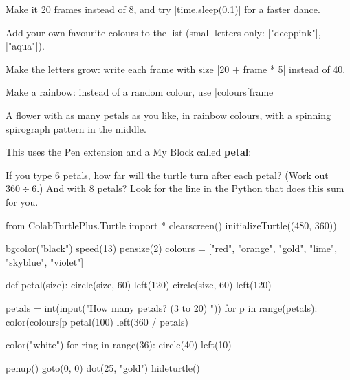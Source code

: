 \begin{challenge}[Level up]
\tick Make it 20 frames instead of 8, and try \py|time.sleep(0.1)| for a faster dance.\par
\tick Add your own favourite colours to the list (small letters only: \py|"deeppink"|, \py|"aqua"|).\par
\tick Make the letters grow: write each frame with size \py|20 + frame * 5| instead of 40.\par
\tick Make a rainbow: instead of a random colour, use \py|colours[frame %
\end{challenge}


A flower with as many petals as you like, in rainbow colours, with a spinning spirograph pattern in the middle.

This uses the Pen extension and a My Block called \textbf{petal}:

\begin{center}
\begin{scratch}
\end{scratch}
\end{center}

\begin{think}
If you type 6 petals, how far will the turtle turn after each petal? (Work out $360 \div 6$.) And with 8 petals? Look for the line in the Python that does this sum for you.
\end{think}

\begin{typethis}
from ColabTurtlePlus.Turtle import *
clearscreen()
initializeTurtle((480, 360))

bgcolor("black")
speed(13)
pensize(2)
colours = ["red", "orange", "gold", "lime",
           "skyblue", "violet"]

def petal(size):
    circle(size, 60)
    left(120)
    circle(size, 60)
    left(120)

petals = int(input("How many petals? (3 to 20) "))
for p in range(petals):
    color(colours[p %
    petal(100)
    left(360 / petals)

color("white")
for ring in range(36):
    circle(40)
    left(10)

penup()
goto(0, 0)
dot(25, "gold")
hideturtle()
\end{typethis}

